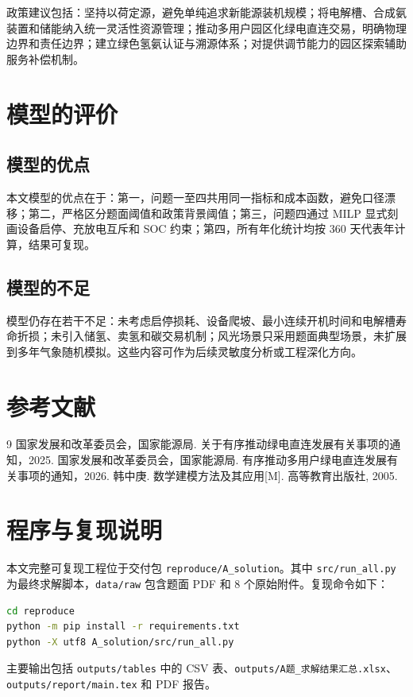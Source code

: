 \documentclass[bwprint]{gmcmthesis}
\numberwithin{figure}{section}
\numberwithin{table}{section}
\begin{document}
政策建议包括：坚持以荷定源，避免单纯追求新能源装机规模；将电解槽、合成氨装置和储能纳入统一灵活性资源管理；推动多用户园区化绿电直连交易，明确物理边界和责任边界；建立绿色氢氨认证与溯源体系；对提供调节能力的园区探索辅助服务补偿机制。

\section{模型的评价}
\subsection{模型的优点}
本文模型的优点在于：第一，问题一至四共用同一指标和成本函数，避免口径漂移；第二，严格区分题面阈值和政策背景阈值；第三，问题四通过 MILP 显式刻画设备启停、充放电互斥和 SOC 约束；第四，所有年化统计均按 360 天代表年计算，结果可复现。

\subsection{模型的不足}
模型仍存在若干不足：未考虑启停损耗、设备爬坡、最小连续开机时间和电解槽寿命折损；未引入储氢、卖氢和碳交易机制；风光场景只采用题面典型场景，未扩展到多年气象随机模拟。这些内容可作为后续灵敏度分析或工程深化方向。

\section{参考文献}
\begin{thebibliography}{9}
\setlength{\itemsep}{-2mm}
 国家发展和改革委员会，国家能源局. 关于有序推动绿电直连发展有关事项的通知，2025.
 国家发展和改革委员会，国家能源局. 有序推动多用户绿电直连发展有关事项的通知，2026.
 韩中庚. 数学建模方法及其应用[M]. 高等教育出版社, 2005.
\end{thebibliography}

\newpage
\appendix
\section{程序与复现说明}
本文完整可复现工程位于交付包 \texttt{reproduce/A\_solution}。其中 \texttt{src/run\_all.py} 为最终求解脚本，\texttt{data/raw} 包含题面 PDF 和 8 个原始附件。复现命令如下：
\begin{lstlisting}[language=bash]
cd reproduce
python -m pip install -r requirements.txt
python -X utf8 A_solution/src/run_all.py
\end{lstlisting}
主要输出包括 \texttt{outputs/tables} 中的 CSV 表、\texttt{outputs/A题\_求解结果汇总.xlsx}、\texttt{outputs/report/main.tex} 和 PDF 报告。
\end{document}
